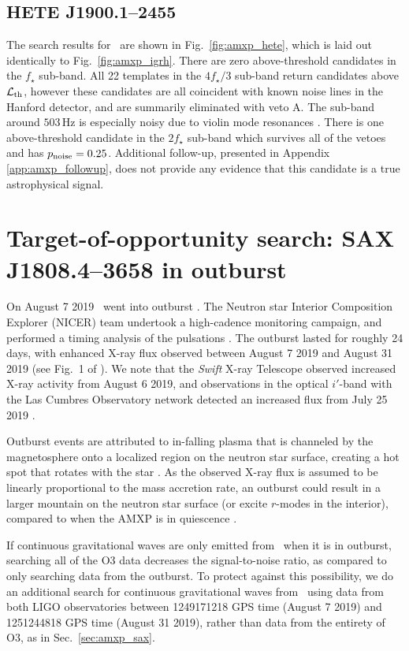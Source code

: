 \subsection{HETE J1900.1--2455  \label{sec:amxp_hete} }
The search results for \hete\ are shown in Fig.~\ref{fig:amxp_hete}, which is laid out identically to Fig.~\ref{fig:amxp_igrh}. There are zero above-threshold candidates in the $f_\star$ sub-band. All 22 templates in the $4f_\star / 3$ sub-band return candidates above $\mathcal{L}_{\rm th}$, however these candidates are all coincident with known noise lines in the Hanford detector, and are summarily eliminated with veto A. The sub-band around $503\,$Hz is especially noisy due to violin mode resonances \cite{o23DetChar}. There is one above-threshold candidate in the $2f_\star$ sub-band which survives all of the vetoes and has $p_{\rm noise}=0.25$. Additional follow-up, presented in Appendix \ref{app:amxp_followup}, does not provide any evidence that this candidate is a true astrophysical signal.

\section{Target-of-opportunity search: SAX J1808.4--3658 in outburst \label{sec:amxp_shortsax}}
On August 7 2019 \sax\ went into outburst \cite{Bult2019}. The Neutron star Interior Composition Explorer (NICER) team undertook a high-cadence monitoring campaign, and performed a timing analysis of the pulsations \cite{Bult2020}. The outburst lasted for roughly 24 days, with enhanced X-ray flux observed between August 7 2019 and August 31 2019 (see Fig.~1 of \citet{Bult2020}). We note that the \emph{Swift} X-ray Telescope observed increased X-ray activity from August 6 2019, and observations in the optical $i'$-band with the Las Cumbres Observatory network detected an increased flux from July 25 2019 \cite{Goodwin2020}.

Outburst events are attributed to in-falling plasma that is channeled by the magnetosphere onto a localized region on the neutron star surface, creating a hot spot that rotates with the star \cite{Romanova2004}. As the observed X-ray flux is assumed to be linearly proportional to the mass accretion rate, an outburst could result in a larger mountain on the neutron star surface (or excite $r$-modes in the interior), compared to when the AMXP is in quiescence \cite{Haskell2015GW, Haskell2017a}. 

If continuous gravitational waves are only emitted from \sax\ when it is in outburst, searching all of the O3 data decreases the signal-to-noise ratio, as compared to only searching data from the outburst. To protect against this possibility, we do an additional search for continuous gravitational waves from \sax\ using data from both LIGO observatories between 1249171218 GPS time (August 7 2019) and 1251244818 GPS time (August 31 2019), rather than data from the entirety of O3, as in Sec.~\ref{sec:amxp_sax}. 

